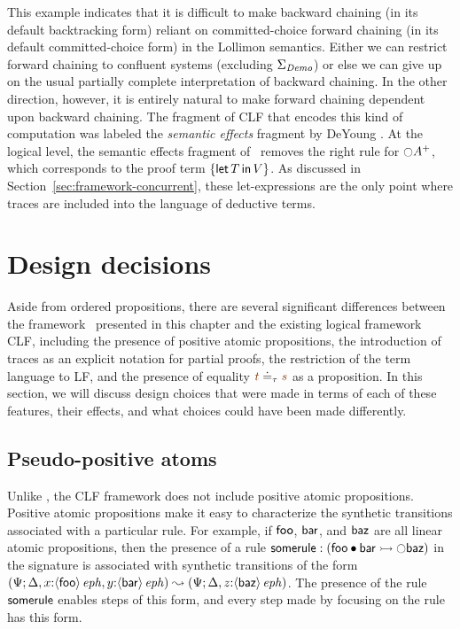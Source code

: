 This example indicates that it is difficult to make backward chaining
(in its default backtracking form) reliant on committed-choice forward
chaining (in its default committed-choice form) in the 
Lollimon semantics. Either we can restrict forward chaining to confluent
systems (excluding $\Sigma_{\it Demo}$) or else we can give up on the
usual partially complete interpretation of backward chaining.  In the
other direction, however, it is entirely natural to make forward
chaining dependent upon backward chaining. The fragment of CLF that
encodes this kind of computation was labeled the {\it semantic
  effects} fragment by DeYoung \cite{deyoung09reasoning}. At the
logical level, the semantic effects fragment of \sls~removes the right
rule for ${\ocircle}A^+$, which corresponds to the proof term
$\{{\sf let}\,{T}\,{\sf in}\, {V} \}$.  As discussed in
Section~\ref{sec:framework-concurrent}, these
let-expressions are the only point
where traces are included into the language of
deductive terms.

\section{Design decisions}
\label{sec:designdecisions}

Aside from ordered propositions, there are several significant
differences between the framework \sls~presented in this chapter and
the existing logical framework CLF, including the presence of positive
atomic propositions, the introduction of traces as an explicit
notation for partial proofs, the restriction of the term language to
LF, and the presence of equality $\lf{t} \doteq_\tau \lf{s}$ as a
proposition. In this section, we will discuss design choices that were
made in terms of each of these features, their effects, and what
choices could have been made differently.

\subsection{Pseudo-positive atoms}
\label{sec:pseudopositive}

Unlike \sls, the CLF framework does not include positive atomic
propositions. Positive atomic propositions make it easy to
characterize the synthetic transitions associated with a particular
rule. For example, if ${\sf foo}$, ${\sf bar}$, and ${\sf baz}$ are
all linear atomic propositions, then the presence of a rule ${\sf
  somerule} : \left({\sf foo} \mathbin{\bullet} {\sf bar} \rightarrowtail {\ocircle}{\sf
    baz}\right)$ in the signature is associated with synthetic
transitions of the form
%
$(\Psi; {\Delta},{{x{:}{\langle {\sf
        foo} \rangle}\,{{\it eph}}},{y{:}{\langle {\sf bar} \rangle}\,{{\it eph}}}})
 \leadsto
 (\Psi; {\Delta},{z{:}{\langle {\sf baz} \rangle}\,{{\it eph}}})$.
%
The presence of the
rule $\sf somerule$ enables steps of this form, and every step made by
focusing on the rule has this form.

